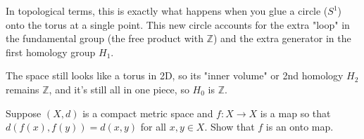 \begin{solution}
In topological terms, this is exactly what happens when you glue a circle ($S^1$) onto the torus at a single point. This new circle accounts for the extra "loop" in the fundamental group (the free product with $\mathbb{Z}$) and the extra generator in the first homology group $H_1$.

The space still looks like a torus in 2D, so its "inner volume" or 2nd homology $H_2$ remains $\mathbb{Z}$, and it's still all in one piece, so $H_0$ is $\mathbb{Z}$.
\end{solution}

\begin{exercise}
\label{geometry:2013:2}
Suppose $(X, d)$ is a compact metric space and $f : X \to X$ is a map so that $d(f(x), f(y)) = d(x, y)$ for all $x, y \in X$. Show that $f$ is an onto map.
\end{exercise}

